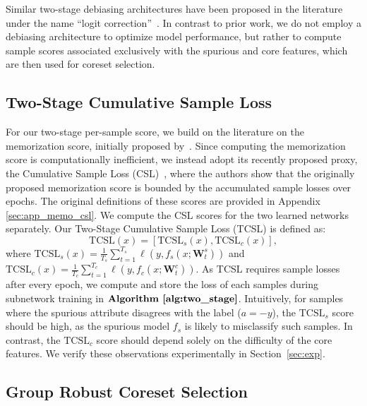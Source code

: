 \documentclass[letter,11pt]{article}
\begin{document}
Similar two-stage debiasing architectures have been proposed in the literature under the name ``logit correction''~\citep{LC,uLA,LFF,MAT}. In contrast to prior work, we do not employ a debiasing architecture to optimize model performance, but rather to compute sample scores associated exclusively with the spurious and core features, which are then used for coreset selection.

\subsection{Two-Stage Cumulative Sample Loss}\label{sec:memo_proxy}
For our two-stage per-sample score, we build on the literature on the memorization score, initially proposed by~\cite{Memorization}. Since computing the memorization score is computationally inefficient, we instead adopt its recently proposed proxy, the Cumulative Sample Loss (CSL)~\citep{CSL}, where the authors show that the originally proposed memorization score is bounded by the accumulated sample losses over epochs. The original definitions of these scores are provided in Appendix \ref{sec:app_memo_csl}.
We compute the CSL scores for the two learned networks separately. Our Two-Stage Cumulative Sample Loss (TCSL) is defined as:
\begin{equation}
    \text{TCSL}(x) = \left[\text{TCSL}_s(x), \text{TCSL}_c(x)\right],
\end{equation}
where $\text{TCSL}_s(x) = \frac{1}{T_s}\sum_{t=1}^{T_s}\ell(y,f_s(x;\mathbf{W}_t^s))$ and $\text{TCSL}_c(x) = \frac{1}{T_c}\sum_{t=1}^{T_c}\ell(y,f_c(x;\mathbf{W}_t^c))$. As TCSL requires sample losses after every epoch, we compute and store the loss of each samples during subnetwork training in $\textbf{Algorithm \ref{alg:two_stage}}$. Intuitively, for samples where the spurious attribute disagrees with the label ($a=-y$), the $\text{TCSL}_s$ score should be high, as the spurious model $f_s$ is likely to misclassify such samples. In contrast, the $\text{TCSL}_c$ score should depend solely on the difficulty of the core features. We verify these observations experimentally in Section~\ref{sec:exp}.

\subsection{Group Robust Coreset Selection}\label{sec:cor_sel}
\end{document}
